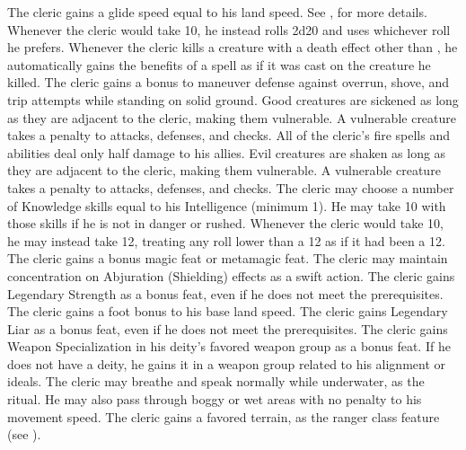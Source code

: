  The cleric gains a glide speed equal to his land speed. See , for more details.
 Whenever the cleric would take 10, he instead rolls 2d20 and uses whichever roll he prefers.
 Whenever the cleric kills a creature with a death effect other than , he automatically gains the benefits of a  spell as if it was cast on the creature he killed.
 The cleric gains a  bonus to maneuver defense against overrun, shove, and trip attempts while standing on solid ground.
 Good creatures are sickened as long as they are adjacent to the cleric, making them vulnerable. A vulnerable creature takes a  penalty to attacks, defenses, and checks.
 All of the cleric's fire spells and abilities deal only half damage to his allies.
 Evil creatures are shaken as long as they are adjacent to the cleric, making them vulnerable. A vulnerable creature takes a  penalty to attacks, defenses, and checks.
 The cleric may choose a number of Knowledge skills equal to his Intelligence (minimum 1). He may take 10 with those skills if he is not in danger or rushed.
 Whenever the cleric would take 10, he may instead take 12, treating any roll lower than a 12 as if it had been a 12.
 The cleric gains a bonus magic feat or metamagic feat.
 The cleric may maintain concentration on Abjuration (Shielding) effects as a swift action.
 The cleric gains Legendary Strength as a bonus feat, even if he does not meet the prerequisites.
 The cleric gains a  foot bonus to his base land speed.
 The cleric gains Legendary Liar as a bonus feat, even if he does not meet the prerequisites.
 The cleric gains Weapon Specialization in his deity's favored weapon group as a bonus feat. If he does not have a deity, he gains it in a weapon group related to his alignment or ideals.
 The cleric may breathe and speak normally while underwater, as the  ritual. He may also pass through boggy or wet areas with no penalty to his movement speed.
 The cleric gains a favored terrain, as the ranger class feature (see ).

